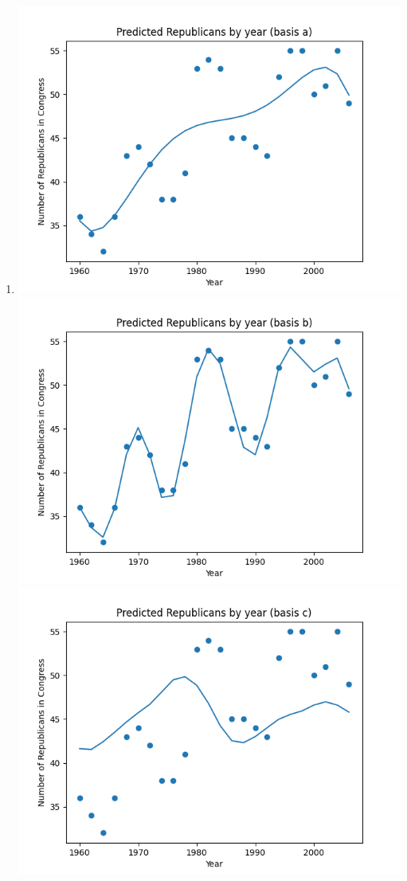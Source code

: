 \documentclass[submit]{harvardml}
\begin{document}
\begin{enumerate}
    \item
    \includegraphics{41a.png}
    \includegraphics{41b.png}
    \includegraphics{41c.png}

\end{enumerate}
\end{document}
